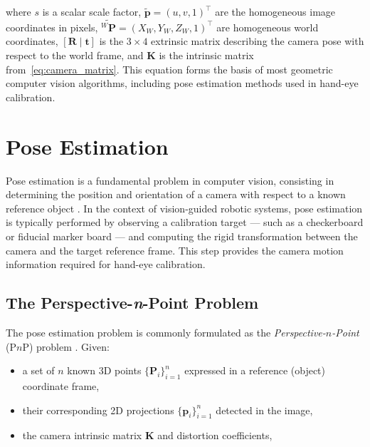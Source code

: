 \noindent where $s$ is a scalar scale factor, $\tilde{\mathbf{p}} =
(u, v, 1)^{\top}$ are the homogeneous image coordinates in pixels,
$\widetilde{{}^W\mathbf{P}} = (X_W, Y_W, Z_W, 1)^{\top}$ are homogeneous world
coordinates, $[\mathbf{R} \mid \mathbf{t}]$ is the $3 \times 4$ extrinsic matrix
describing the camera pose with respect to the world frame, and $\mathbf{K}$ is
the intrinsic matrix from~\eqref{eq:camera_matrix}. This equation forms the basis
of most geometric computer vision algorithms, including pose estimation methods
used in hand-eye calibration.




\section{Pose Estimation}
\label{sec:pose_estimation}

Pose estimation is a fundamental problem in computer vision, consisting in
determining the position and orientation of a camera with respect to a known
reference object \cite{hartley2004multiple}. In the context of vision-guided
robotic systems, pose estimation is typically performed by observing a calibration
target — such as a checkerboard or fiducial marker board — and computing the
rigid transformation between the camera and the target reference frame. This step
provides the camera motion information required for hand-eye calibration.

\subsection{The Perspective-\textit{n}-Point Problem}
\label{subsec:pnp}

The pose estimation problem is commonly formulated as the
\textit{Perspective-$n$-Point} (P$n$P) problem \cite{lepetit2009epnp}. Given:
\begin{itemize}
    \item a set of $n$ known 3D points $\{\mathbf{P}_i\}_{i=1}^{n}$ expressed in
    a reference (object) coordinate frame,
    \item their corresponding 2D projections $\{\mathbf{p}_i\}_{i=1}^{n}$
    detected in the image,
    \item the camera intrinsic matrix $\mathbf{K}$ and distortion coefficients,
\end{itemize}

